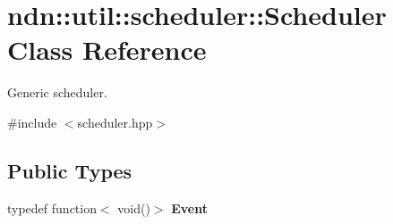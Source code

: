 \hypertarget{classndn_1_1util_1_1scheduler_1_1Scheduler}{}\section{ndn\+:\+:util\+:\+:scheduler\+:\+:Scheduler Class Reference}
\label{classndn_1_1util_1_1scheduler_1_1Scheduler}


Generic scheduler.  




{\ttfamily \#include $<$scheduler.\+hpp$>$}

\subsection*{Public Types}
\begin{DoxyCompactItemize}
\item 
typedef function$<$ void()$>$ {\bfseries Event}\hypertarget{classndn_1_1util_1_1scheduler_1_1Scheduler_a057a6b32ccb992f63c93d75ddb634090}{}\label{classndn_1_1util_1_1scheduler_1_1Scheduler_a057a6b32ccb992f63c93d75ddb634090}

\end{DoxyCompactItemize}
